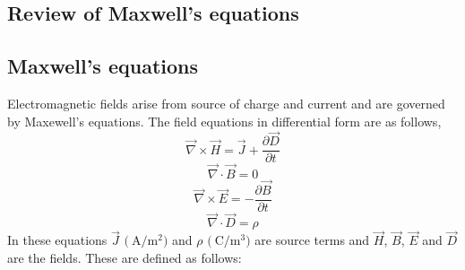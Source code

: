 \documentclass[12pt,a4paper,oneside]{book}
\begin{document}
\begin{onehalfspace}
\chapter{Review of Maxwell's equations}
\section{Maxwell's equations}
Electromagnetic fields arise from source of charge and current and are governed by Maxewell's equations. The field equations in differential form are as follows,
 \begin{equation}\label{maxwell_1}
 	\vec{\nabla}\times\vec{H}=\vec{J} + \frac{\partial \vec{D}}{\partial t}
 \end{equation}
\begin{equation}\label{maxwell_2}
	\vec{\nabla}\cdot\vec{B}=0
\end{equation}
 \begin{equation}\label{maxwell_3}
	\vec{\nabla}\times\vec{E}=- \frac{\partial \vec{B}}{\partial t}
\end{equation}
\begin{equation}\label{maxwell_4}
	\vec{\nabla}\cdot\vec{D}=\rho
\end{equation}
In these equations $\vec{J}$ $\big(\SI{}{\ampere\per\square\meter}\big)$ and $\rho$ $\big(\SI{}{\coulomb\per\cubic\meter}\big)$ are source terms and $\vec{H}$, $\vec{B}$, $\vec{E}$ and $\vec{D}$ are the fields. These are defined as follows:
\begin{center}
\end{center}

\end{onehalfspace}
\end{document}
